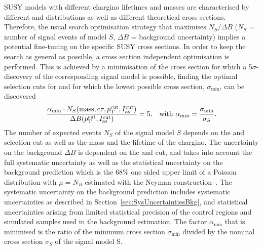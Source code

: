 SUSY models with different chargino lifetimes and masses are characterised by different \pt and \ias distributions as well as different theoretical cross sections.
Therefore, the usual search optimisation strategy that maximises $N_S/\Delta B$ ($N_S$ = number of signal events of model $S$, $\Delta B$ = background uncertainty) implies a potential fine-tuning on the specific SUSY cross sections.
In order to keep the search as general as possible, a cross section independent optimisation is performed.
This is achieved by a minimisation of the cross section for which a 5$\sigma$-discovery of the corresponding signal model is possible, \ie finding the optimal selection cuts for \pt and \ias for which the lowest possible cross section, $\sigma_{\text{min}}$, can be discovered
\begin{align}
\label{eq:optimisation}
\frac{\alpha_{\text{min}} \cdot N_S(\text{mass},\text{c}\tau,p_{\text{T}}^{\text{cut}}, I_{\text{as}}^{\text{cut}})}{\Delta B (p_{\text{T}}^{\text{cut}}, I_{\text{as}}^{\text{cut}})} = 5. && \text{with   } \alpha_{\text{min}} = \frac{\sigma_{\text{min}}}{\sigma_{S}}.
\end{align}
The number of expected events $N_S$ of the signal model $S$ depends on the \pt and \ias selection cut as well as the mass and the lifetime of the chargino.
The uncertainty on the background $\Delta B$ is dependent on the \pt and \ias cut, and takes into account the full systematic uncertainty as well as the statistical uncertainty on the background prediction which is the 68\% one sided upper limit of a Poisson distribution with $\mu = N_B$ estimated with the Neyman construction~\cite{bib:Neyman_1937,bib:PDG_2014}.
The systematic uncertainty on the background prediction includes systematic uncertainties as described in Section~\ref{sec:SysUncertaintiesBkg}, and statistical uncertainties arising from limited statistical precision of the control regions and simulated samples used in the background estimation.
The factor $\alpha_{\text{min}}$  that is minimised is the ratio of the minimum cross section $\sigma_{\text{min}}$ divided by the nominal cross section $\sigma_{S}$ of the signal model S.\\

